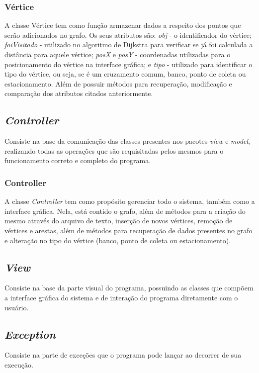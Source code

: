 \documentclass[12pt]{article}
\begin{document}
\subsubsection{Vértice}
A classe Vértice tem como função armazenar dados a respeito dos pontos que serão adicionados no grafo. Os seus atributos são: {\itshape obj} - o identificador do vértice; {\itshape foiVisitado} - utilizado no algoritmo de Dijkstra para verificar se já foi calculada a distância para aquele vértice; {\itshape posX} e {\itshape posY} - coordenadas utilizadas para o posicionamento do vértice na interface gráfica; e {\itshape tipo} - utilizado para identificar o tipo do vértice, ou seja, se é um cruzamento comum, banco, ponto de coleta ou estacionamento. Além de possuir métodos para recuperação, modificação e comparação dos atributos citados anteriormente.

\subsection{{\itshape Controller}}
Consiste na base da comunicação das classes presentes nos pacotes {\itshape view} e {\itshape model}, realizando todas as operações que são requisitadas pelos mesmos para o funcionamento correto e completo do programa.

\subsubsection{Controller}
A classe {\itshape Controller} tem como propósito gerenciar todo o sistema, também como a interface gráfica. Nela, está contido o grafo, além de métodos para a criação do mesmo através do arquivo de texto, inserção de novos vértices, remoção de vértices e arestas, além de métodos para recuperação de dados presentes no grafo e alteração no tipo do vértice (banco, ponto de coleta ou estacionamento).

\subsection{{\itshape View}}
Consiste na base da parte visual do programa, possuindo as classes que compõem a interface gráfica do sistema e de interação do programa diretamente com o usuário.

\subsubsection{}

\subsection{{\itshape Exception}}
Consiste na parte de exceções que o programa pode lançar ao decorrer de sua execução.
\end{document}

